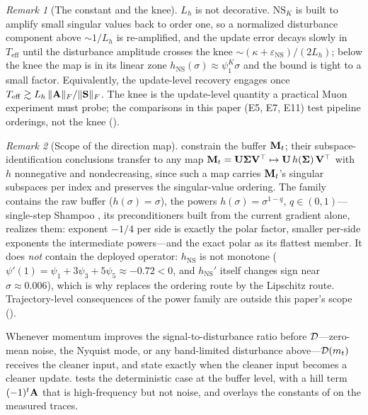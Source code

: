 \documentclass[11pt,a4paper]{article}
\theoremstyle{remark}
\newtheorem{remark}{Remark}
\newcommand{\Teff}{T_{\mathrm{eff}}}
\begin{document}
\begin{remark}[The constant and the knee]
\label{rem:knee}
$L_h$ is not decorative.
$\mathrm{NS}_K$ is built to amplify small singular values back to order one, so a normalized disturbance component above ${\sim}1/L_h$ is re-amplified, and the update error decays slowly in $\Teff$ until the disturbance amplitude crosses the knee ${\sim}(\kappa+\varepsilon_{\mathrm{NS}})/(2L_h)$; below the knee the map is in its linear zone $h_{\mathrm{NS}}(\sigma)\approx\psi_1^K\sigma$ and the bound is tight to a small factor.
Equivalently, the update-level recovery engages once $\Teff\gtrsim L_h\,\lVert\Abf\rVert_F/\lVert\Sbf\rVert_F$.
The knee is the update-level quantity a practical Muon experiment must probe; the comparisons in this paper (E5, E7, E11) test pipeline orderings, not the knee ().
\end{remark}

\begin{remark}[Scope of the direction map]
\label{rem:mapscope}
 constrain the buffer $\mathbf{M}_t$; their subspace-identification conclusions transfer to any map $\mathbf{M}_t=\mathbf{U}\bm{\Sigma}\mathbf{V}^\top\mapsto \mathbf{U}\,h(\bm{\Sigma})\,\mathbf{V}^\top$ with $h$ nonnegative and nondecreasing, since such a map carries $\mathbf{M}_t$'s singular subspaces per index and preserves the singular-value ordering.
The family contains the raw buffer ($h(\sigma)=\sigma$), the powers $h(\sigma)=\sigma^{1-q}$, $q\in(0,1)$---single-step Shampoo \citep{gupta2018shampoo}, its preconditioners built from the current gradient alone, realizes them: exponent $-1/4$ per side is exactly the polar factor, smaller per-side exponents the intermediate powers---and the exact polar as its flattest member.
It does \emph{not} contain the deployed operator: $h_{\mathrm{NS}}$ is not monotone ($\psi'(1)=\psi_1+3\psi_3+5\psi_5\approx-0.72<0$, and $h_{\mathrm{NS}}'$ itself changes sign near $\sigma\approx0.006$), which is why  replaces the ordering route by the Lipschitz route.
Trajectory-level consequences of the power family are outside this paper's scope ().
\end{remark}

Whenever momentum improves the signal-to-disturbance ratio before $\mathcal{D}$---zero-mean noise, the Nyquist mode, or any band-limited disturbance above---$\mathcal{D}(m_t)$ receives the cleaner input, and  state exactly when the cleaner input becomes a cleaner update.
 tests the deterministic case at the buffer level, with a hill term $(-1)^t\mathbf{A}$ that is high-frequency but not noise, and overlays the constants of  on the measured traces.
\end{document}
